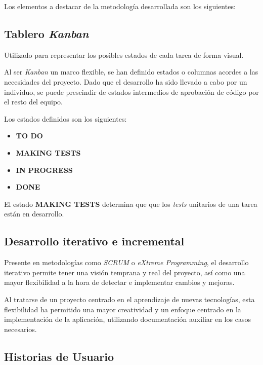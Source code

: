 \documentclass[10pt, a4paper]{aqademic}
\begin{document}
Los elementos a destacar de la metodología desarrollada son los siguientes:

\subsection*{Tablero \textit{Kanban}}

Utilizado para representar los posibles estados de cada tarea de forma visual.

\medskip

Al ser \textit{Kanban} un marco flexible, se han definido estados o columnas acordes a las necesidades del proyecto. Dado que el desarrollo ha sido llevado a cabo por un individuo, se puede prescindir de estados intermedios de aprobación de código por el resto del equipo.

\medskip

Los estados definidos son los siguientes:

\begin{itemize}
	\item \textbf{TO DO}
	\item \textbf{MAKING TESTS}
	\item \textbf{IN PROGRESS}
	\item \textbf{DONE} 
\end{itemize}

El estado \textbf{MAKING TESTS} determina que que los \textit{tests} unitarios de una tarea están en desarrollo.


\subsection*{Desarrollo iterativo e incremental}

Presente en metodologías como \textit{SCRUM} o \textit{eXtreme Programming}, el desarrollo iterativo permite tener una visión temprana y real del proyecto, así como una mayor flexibilidad a la hora de detectar e implementar cambios y mejoras.

\medskip

Al tratarse de un proyecto centrado en el aprendizaje de nuevas tecnologías, esta flexibilidad ha permitido una mayor creatividad y un enfoque centrado en la implementación de la aplicación, utilizando documentación auxiliar en los casos necesarios.


\subsection*{Historias de Usuario}
\end{document}
